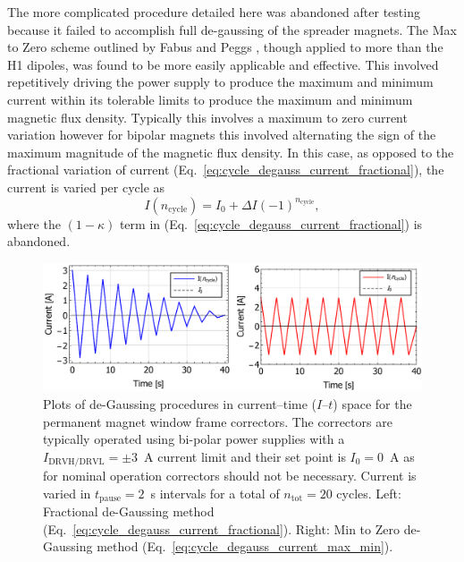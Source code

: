 \documentclass[../main.tex]{subfiles}
\begin{document}
The more complicated procedure detailed here was abandoned after testing because it failed to accomplish full de-gaussing of the spreader magnets. The Max to Zero scheme outlined by Fabus and Peggs \cite{fabus2019hysteresis}, though applied to more than the H1 dipoles, was found to be more easily applicable and effective. This involved repetitively driving the power supply to produce the maximum and minimum current within its tolerable limits to produce the maximum and minimum magnetic flux density. Typically this involves a maximum to zero current variation however for bipolar magnets this involved alternating the sign of the maximum magnitude of the magnetic flux density. In this case, as opposed to the fractional variation of current (Eq.~\ref{eq:cycle_degauss_current_fractional}), the current is varied per cycle as
\begin{equation}
I\left(n_{\mathrm{cycle}}\right) =  I_{0}+\Delta I\left(-1\right)^{n_{\mathrm{cycle}}},
\label{eq:cycle_degauss_current_max_min}
\end{equation}
where the $\left(1-\kappa\right)$ term in (Eq.~\ref{eq:cycle_degauss_current_fractional}) is abandoned.

\begin{figure}[!h]
\centering
\includegraphics[width=\textwidth]{Figures/CBETA_Multi-Pass_Commissioning/degauss/degauss_current_time_corrector.pdf}
\caption{Plots of de-Gaussing procedures in current--time ($I$--$t$) space for the permanent magnet window frame correctors. The correctors are typically operated using bi-polar power supplies with a $I_{\mathrm{DRVH/DRVL}}=\pm3$~\si{\ampere} current limit and their set point is $I_{0}=0$~\si{\ampere} as for nominal operation correctors should not be necessary. Current is varied in $t_{\mathrm{pause}}=2$~\si{\second} intervals for a total of $n_{\mathrm{tot}}=20$ cycles. Left: Fractional de-Gaussing method (Eq.~\ref{eq:cycle_degauss_current_fractional}). Right: Min to Zero de-Gaussing method (Eq.~\ref{eq:cycle_degauss_current_max_min}). }
\label{fig:corrector_degauss_procedure}
\end{figure}
\end{document}
